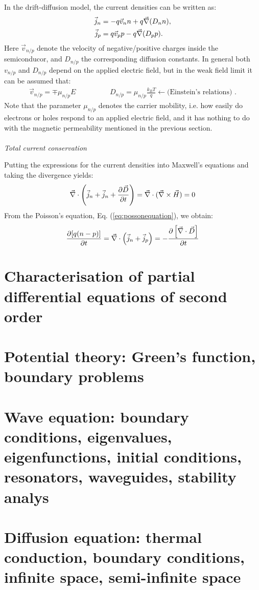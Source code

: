 \documentclass[10pt,a4paper]{report}
\def\Nabla{\ensuremath\vec{\nabla}}
\def\curl{\ensuremath\Nabla\times}
\def\div{\ensuremath\Nabla\cdot}
\begin{document}
In the drift-diffusion model, the current densities can be written as:
\begin{align*}
  \vec{j}_n &= -q \vec{v}_n n + q\Nabla (D_n n), \\
  \vec{j}_p &=  q \vec{v}_p p - q\Nabla (D_p p).
\end{align*}
Here $\vec{v}_{n/p}$ denote the velocity of negative/positive charges inside the semiconducor, and $D_{n/p}$ the corresponding diffusion constants. In general both $v_{n/p}$ and $D_{n/p}$ depend on the applied electric field, but in the 
weak field limit it can be assumed that: 
\begin{align*}
  \vec{v}_{n/p} = \mp \mu_{n/p} E \hspace{2cm} D_{n/p}=\mu_{n/p} \frac{k_BT}{q}  \leftarrow \text{(Einstein's relations) }. 
\end{align*}
Note that the parameter $\mu_{n/p}$ denotes the carrier mobility, i.e. how easily do electrons or holes respond to an applied electric field, and it has nothing to do with the magnetic permeability mentioned in the previous section.\\\\
\emph{Total current conservation}

Putting the expressions for the current densities into Maxwell's equations and taking the divergence yields:
\begin{equation*}
  \div \left ( \vec{j}_n + \vec{j}_n +\frac{\partial \vec{D}}{\partial t} \right ) = \div (\curl \vec{H}) = 0
\end{equation*}
From the Poisson's equation, Eq. (\ref{eq:possonequation}), we obtain:
\begin{equation*}
  \frac{\partial [q(n-p)]}{\partial t} = \div \left (\vec{j}_n+\vec{j}_p \right ) = -\frac{\partial \left [\div \vec{D} \right ]}{\partial t} 
\end{equation*}








\chapter{Characterisation of partial differential equations of second order}

\chapter{Potential theory: Green's function, boundary problems}
\chapter{Wave equation: boundary conditions, eigenvalues, eigenfunctions, initial conditions, resonators, waveguides, stability analys}
\chapter{Diffusion equation: thermal conduction, boundary conditions, infinite space, semi-infinite space} 
\end{document}
